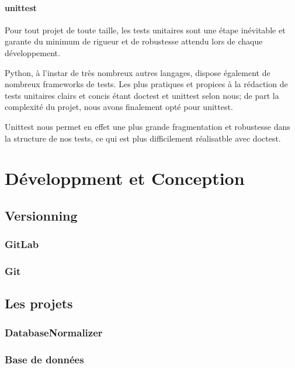 \documentclass{article}
\begin{document}
\paragraph{unittest}

Pour tout projet de toute taille, les tests unitaires sont une étape inévitable et garante du minimum de rigueur et de robustesse attendu lors de chaque développement.

Python, à l'instar de très nombreux autres langages, dispose également de nombreux frameworks de tests.
Les plus pratiques et propices à la rédaction de tests unitaires clairs et concis étant doctest et unittest selon nous;
de part la complexité du projet, nous avons finalement opté pour unittest.

Unittest nous permet en effet une plus grande fragmentation et robustesse dans la structure de nos tests, ce qui est plus difficilement réalisatble  avec doctest.

\newpage


\section{Développment et Conception}

\subsection{Versionning}

\subsubsection{GitLab}

\subsubsection{Git}

\subsection{Les projets}

\subsubsection{DatabaseNormalizer}

\subsubsection{Base de données}
\end{document}
